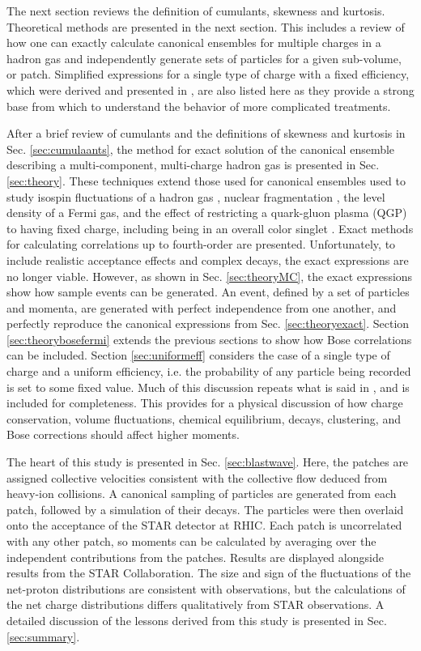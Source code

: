 The next section reviews the definition of cumulants, skewness and kurtosis. Theoretical methods are presented in the next section. This includes a review of how one can exactly calculate canonical ensembles for multiple charges in a hadron gas and independently generate sets of particles for a given sub-volume, or patch.  Simplified expressions for a single type of charge with a fixed efficiency, which were derived and presented in \cite{Savchuk:2019xfg}, are also listed here as they provide a strong base from which to understand the behavior of more complicated treatments.

After a brief review of cumulants and the definitions of skewness and kurtosis in Sec. \ref{sec:cumulaants}, the method for exact solution of the canonical ensemble describing a multi-component, multi-charge hadron gas is presented in Sec. \ref{sec:theory}. These techniques extend those used for canonical ensembles used to study isospin fluctuations of a hadron gas \cite{}, nuclear fragmentation \cite{}, the level density of a Fermi gas, and the effect of restricting a quark-gluon plasma (QGP) to having fixed charge, including being in an overall color singlet \cite{}. Exact methods for calculating correlations up to fourth-order are presented. Unfortunately, to include realistic acceptance effects and complex decays, the exact expressions are no longer viable. However, as shown in Sec. \ref{sec:theoryMC}, the exact expressions show how sample events can be generated. An event, defined by a set of particles and momenta, are generated with perfect independence from one another, and perfectly reproduce the canonical expressions from Sec. \ref{sec:theoryexact}. Section \ref{sec:theorybosefermi} extends the previous sections to show how Bose correlations can be included. Section \ref{sec:uniformeff} considers the case of a single type of charge and a uniform efficiency, i.e. the probability of any particle being recorded is set to some fixed value. Much of this discussion repeats what is said in \cite{Savchuck:2019xfg}, and is included for completeness. This provides for a physical discussion of how charge conservation, volume fluctuations, chemical equilibrium, decays, clustering, and Bose corrections should affect higher moments.

The heart of this study is presented in Sec. \ref{sec:blastwave}. Here, the patches are assigned collective velocities consistent with the collective flow deduced from heavy-ion collisions. A canonical sampling of particles are generated from each patch, followed by a simulation of their decays. The particles were then overlaid onto the acceptance of the STAR detector at RHIC. Each patch is uncorrelated with any other patch, so moments can be calculated by averaging over the independent contributions from the patches. Results are displayed alongside results from the STAR Collaboration. The size and sign of the fluctuations of the net-proton distributions are consistent with observations, but the calculations of the net charge distributions differs qualitatively from STAR observations. A detailed discussion of the lessons derived from this study is presented in Sec. \ref{sec:summary}.
